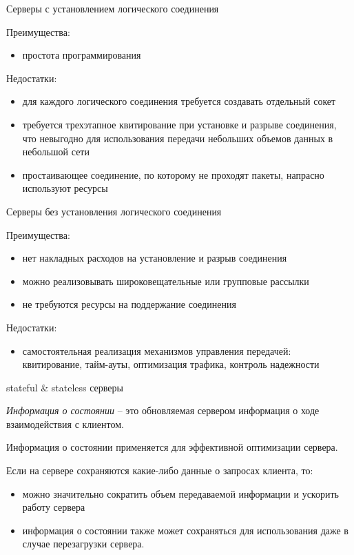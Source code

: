 \begin{frame}{Серверы с установлением логического соединения}

	Преимущества:
	\begin{itemize}
		\item простота программирования
	\end{itemize}

Недостатки:
	\begin{itemize}
		\item для каждого логического соединения требуется создавать отдельный сокет
		\item требуется трехэтапное квитирование при установке и разрыве соединения,  что невыгодно для использования передачи небольших объемов данных в небольшой сети
		\item простаивающее соединение,  по которому не проходят пакеты,  напрасно используют ресурсы
	\end{itemize}
\end{frame}

\begin{frame}{Серверы без установления логического соединения}

	Преимущества:
	\begin{itemize}
		\item нет накладных расходов на установление и разрыв соединения
		\item можно реализовывать широковещательные или групповые рассылки
		\item не требуются ресурсы на поддержание соединения
	\end{itemize}

Недостатки:
	\begin{itemize}
		\item самостоятельная реализация механизмов управления передачей: квитирование, тайм-ауты, оптимизация трафика, контроль надежности
	\end{itemize}
\end{frame}

\begin{frame}{stateful \& stateless серверы}

{\itshape Информация о состоянии} -- это обновляемая сервером информация о ходе взаимодействия с клиентом.

Информация о состоянии применяется для эффективной оптимизации сервера.

Если на сервере сохраняются какие-либо данные о запросах клиента, то: 
	\begin{itemize}
		\item можно значительно сократить объем передаваемой информации и ускорить работу сервера
		\item информация о состоянии также может сохраняться для использования даже в случае перезагрузки сервера. 
	\end{itemize}
\end{frame}

